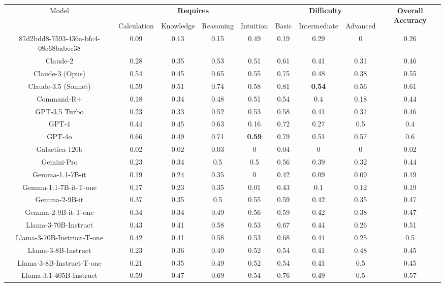 \begin{tabular}{ccccccccc}
\toprule
\multirow{3}{*}{Model} & \multicolumn{4}{c}{\textbf{Requires}} & \multicolumn{3}{c}{\textbf{Difficulty}} & \multirow{3}{*}{\textbf{Overall Accuracy}}\\\cmidrule(lr){2-5} \cmidrule(lr){6-8}\\
 & Calculation & Knowledge & Reasoning & Intuition & Basic & Intermediate & Advanced &  \\
\midrule
87d2bdd8-7593-436a-bfc4-08c68babec38 & 0.09 & 0.13 & 0.15 & 0.49 & 0.19 & 0.29 & 0 & 0.26 \\
Claude-2 & 0.28 & 0.35 & 0.53 & 0.51 & 0.61 & 0.41 & 0.31 & 0.46 \\
Claude-3 (Opus) & 0.54 & 0.45 & 0.65 & 0.55 & 0.75 & 0.48 & 0.38 & 0.55 \\
Claude-3.5 (Sonnet) & 0.59 & 0.51 & 0.74 & 0.58 & 0.81 & \textbf{0.54} & 0.56 & 0.61 \\
Command-R+ & 0.18 & 0.34 & 0.48 & 0.51 & 0.54 & 0.4 & 0.18 & 0.44 \\
GPT-3.5 Turbo & 0.23 & 0.33 & 0.52 & 0.53 & 0.58 & 0.41 & 0.31 & 0.46 \\
GPT-4 & 0.44 & 0.45 & 0.63 & 0.16 & 0.72 & 0.27 & 0.5 & 0.4 \\
GPT-4o & 0.66 & 0.49 & 0.71 & \textbf{0.59} & 0.79 & 0.51 & 0.57 & 0.6 \\
Galactica-120b & 0.02 & 0.02 & 0.03 & 0 & 0.04 & 0 & 0 & 0.02 \\
Gemini-Pro & 0.23 & 0.34 & 0.5 & 0.5 & 0.56 & 0.39 & 0.32 & 0.44 \\
Gemma-1.1-7B-it & 0.19 & 0.24 & 0.35 & 0 & 0.42 & 0.09 & 0.09 & 0.19 \\
Gemma-1.1-7B-it-T-one & 0.17 & 0.23 & 0.35 & 0.01 & 0.43 & 0.1 & 0.12 & 0.19 \\
Gemma-2-9B-it & 0.37 & 0.35 & 0.5 & 0.55 & 0.59 & 0.42 & 0.35 & 0.47 \\
Gemma-2-9B-it-T-one & 0.34 & 0.34 & 0.49 & 0.56 & 0.59 & 0.42 & 0.38 & 0.47 \\
Llama-3-70B-Instruct & 0.43 & 0.41 & 0.58 & 0.53 & 0.67 & 0.44 & 0.26 & 0.51 \\
Llama-3-70B-Instruct-T-one & 0.42 & 0.41 & 0.58 & 0.53 & 0.68 & 0.44 & 0.25 & 0.5 \\
Llama-3-8B-Instruct & 0.23 & 0.36 & 0.49 & 0.52 & 0.54 & 0.41 & 0.48 & 0.45 \\
Llama-3-8B-Instruct-T-one & 0.21 & 0.35 & 0.49 & 0.52 & 0.54 & 0.41 & 0.5 & 0.45 \\
Llama-3.1-405B-Instruct & 0.59 & 0.47 & 0.69 & 0.54 & 0.76 & 0.49 & 0.5 & 0.57 \\

\end{tabular}
